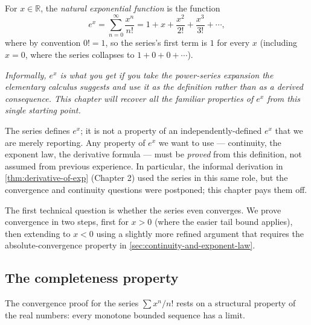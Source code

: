 \begin{definition}\label{def:exponential-function}
For \(x \in \mathbb{R}\), the \emph{natural exponential function} is the function
\[
e^{x} = \sum_{n = 0}^{\infty} \frac{x^{n}}{n!} = 1 + x + \frac{x^{2}}{2!} + \frac{x^{3}}{3!} + \dotsb,
\]
where by convention \(0! = 1\), so the series's first term is \(1\) for every \(x\) (including \(x = 0\), where the series collapses to \(1 + 0 + 0 + \dotsb\)).

\emph{Informally, \(e^{x}\) is what you get if you take the power-series expansion the elementary calculus suggests and use it as the definition rather than as a derived consequence. This chapter will recover all the familiar properties of \(e^{x}\) from this single starting point.}
\end{definition}

\begin{caution}
The series defines \(e^{x}\); it is not a property of an independently-defined \(e^{x}\) that we are merely reporting. Any property of \(e^{x}\) we want to use --- continuity, the exponent law, the derivative formula --- must be \emph{proved} from this definition, not assumed from previous experience. In particular, the informal derivation in \cref{thm:derivative-of-exp} (Chapter 2) used the series in this same role, but the convergence and continuity questions were postponed; this chapter pays them off.
\end{caution}

The first technical question is whether the series even converges. We prove convergence in two steps, first for \(x > 0\) (where the easier tail bound applies), then extending to \(x < 0\) using a slightly more refined argument that requires the absolute-convergence property in \cref{sec:continuity-and-exponent-law}.

\subsection{The completeness property}

The convergence proof for the series \(\sum x^{n}/n!\) rests on a structural property of the real numbers: every monotone bounded sequence has a limit.

